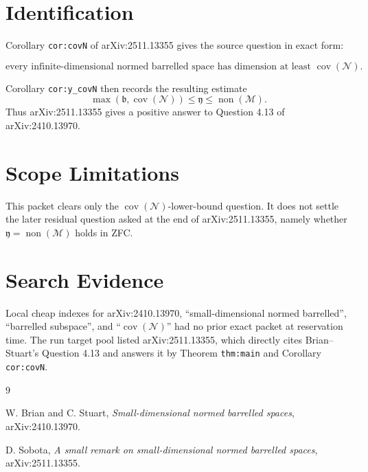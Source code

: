 \documentclass[11pt]{article}
\newcommand{\covN}{\operatorname{cov}(\mathcal N)}
\newcommand{\nonM}{\operatorname{non}(\mathcal M)}
\newcommand{\bfrak}{\mathfrak b}
\newcommand{\yfrak}{\mathfrak y}
\begin{document}
\section*{Identification}

Corollary \texttt{cor:covN} of arXiv:2511.13355 gives the source question in
exact form:

\[
  \text{every infinite-dimensional normed barrelled space has dimension at
  least }\covN.
\]

Corollary \texttt{cor:y\_covN} then records the resulting estimate
\[
  \max(\bfrak,\covN) \leq \yfrak \leq \nonM.
\]
Thus arXiv:2511.13355 gives a positive answer to Question 4.13 of
arXiv:2410.13970.

\section*{Scope Limitations}

This packet clears only the \(\covN\)-lower-bound question.  It does not settle
the later residual question asked at the end of arXiv:2511.13355, namely
whether \(\yfrak=\nonM\) holds in ZFC.

\section*{Search Evidence}

Local cheap indexes for arXiv:2410.13970, ``small-dimensional normed
barrelled'', ``barrelled subspace'', and ``\(\covN\)'' had no prior exact
packet at reservation time.  The run target pool listed arXiv:2511.13355,
which directly cites Brian--Stuart's Question 4.13 and answers it by Theorem
\texttt{thm:main} and Corollary \texttt{cor:covN}.

\begin{thebibliography}{9}

W. Brian and C. Stuart,
\emph{Small-dimensional normed barrelled spaces}, arXiv:2410.13970.

D. Sobota,
\emph{A small remark on small-dimensional normed barrelled spaces},
arXiv:2511.13355.

\end{thebibliography}
\end{document}
